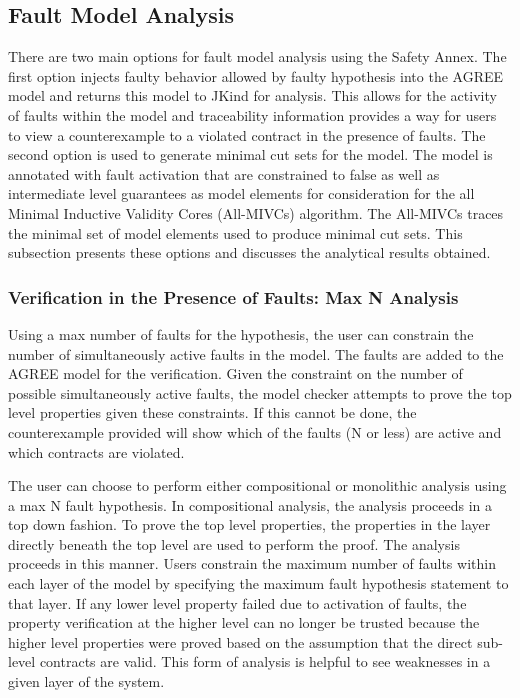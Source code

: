 \subsection{Fault Model Analysis}
There are two main options for fault model analysis using the Safety Annex. The first option injects faulty behavior allowed by faulty hypothesis into the AGREE model and returns this model to JKind for analysis. This allows for the activity of faults within the model and traceability information provides a way for users to view a counterexample to a violated contract in the presence of faults. The second option is used to generate minimal cut sets for the model. The model is annotated with fault activation that are constrained to false as well as intermediate level guarantees as model elements for consideration for the all Minimal Inductive Validity Cores (All-MIVCs)
algorithm. The All-MIVCs traces the minimal set of model elements used to produce minimal cut sets. This subsection presents these options and discusses the analytical results obtained. 

\subsubsection{Verification in the Presence of Faults: Max N Analysis}
Using a max number of faults for the hypothesis, the user can constrain the number of simultaneously active faults in the model. The faults are added to the AGREE model for the verification. Given the constraint on the number of possible simultaneously active faults, the model checker attempts to prove the top level properties given these constraints. If this cannot be done, the counterexample provided will show which of the faults (N or less) are active and which contracts are violated. 

The user can choose to perform either compositional or monolithic analysis using a max N fault hypothesis. In compositional analysis, the analysis proceeds in a top down fashion. To prove the top level properties, the properties in the layer directly beneath the top level are used to perform the proof. The analysis proceeds in this manner. Users constrain the maximum number of faults within each layer of the model by specifying the maximum fault hypothesis statement to that layer. If any lower level property failed due to activation of faults, the property verification at the higher level can no longer be trusted because the higher level properties were proved based on the assumption that the direct sub-level contracts are valid. This form of analysis is helpful to see weaknesses in a given layer of the system. 

